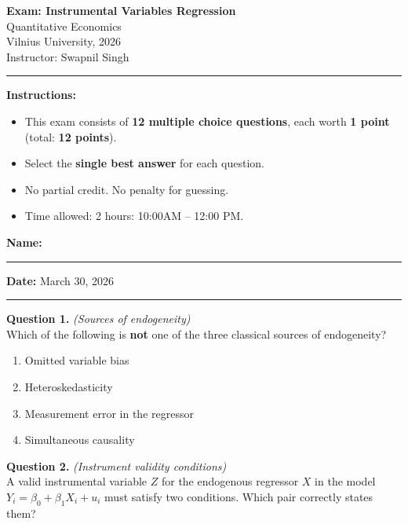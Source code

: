 \documentclass[11pt]{article}
\newcommand{\choices}[4]{%
  \begin{enumerate}[label=(\alph*), leftmargin=2em, itemsep=2pt]
    \item #1
    \item #2
    \item #3
    \item #4
  \end{enumerate}
}
\begin{document}
\begin{center}
  {\LARGE\bfseries Exam: Instrumental Variables Regression}\\[0.5em]
  {\large Quantitative Economics }\\[0.3em]
  {\normalsize Vilnius University, 2026}\\[0.3em]
  {\normalsize Instructor: Swapnil Singh}\\[1em]
  \rule{0.6\textwidth}{0.4pt}
\end{center}

\vspace{0.5em}

\noindent\textbf{Instructions:}
\begin{itemize}[leftmargin=1.5em, itemsep=2pt]
  \item This exam consists of \textbf{12 multiple choice questions}, each worth \textbf{1 point} (total: \textbf{12 points}).
  \item Select the \textbf{single best answer} for each question.
  \item No partial credit. No penalty for guessing.
  \item Time allowed: 2 hours: 10:00AM -- 12:00 PM.
\end{itemize}

\vspace{0.3em}
\noindent\textbf{Name:} \rule{8cm}{0.4pt} \hfill \textbf{Date:} March 30, 2026

\vspace{1em}
\rule{\textwidth}{0.4pt}


\bigskip

\noindent\textbf{Question 1.} \textit{(Sources of endogeneity)} \\[0.3em]
Which of the following is \textbf{not} one of the three classical sources of endogeneity?

\choices
{Omitted variable bias}
{Heteroskedasticity}
{Measurement error in the regressor}
{Simultaneous causality}

\bigskip


\noindent\textbf{Question 2.} \textit{(Instrument validity conditions)} \\[0.3em]
A valid instrumental variable $Z$ for the endogenous regressor $X$ in the model $Y_i = \beta_0 + \beta_1 X_i + u_i$ must satisfy two conditions. Which pair correctly states them?
\end{document}
